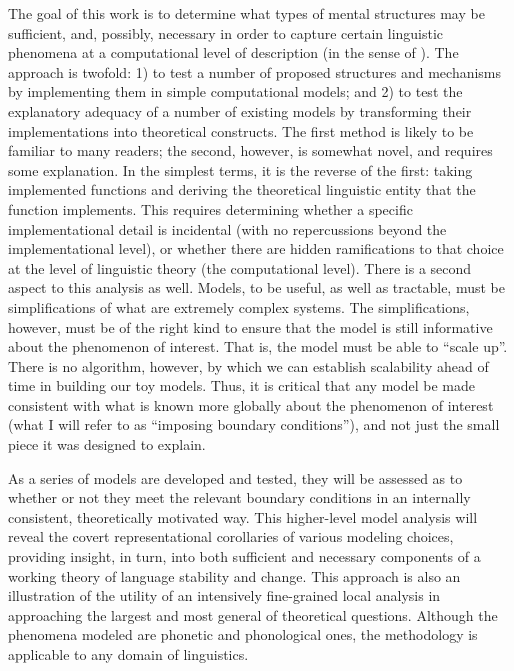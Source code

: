 The goal of this work is to determine what types of mental structures
may be sufficient, and, possibly, necessary in order to capture certain
linguistic phenomena at a computational level of description (in the
sense of \citealt{marr1982vision}). The approach is twofold: 1) to
test a number of proposed structures and mechanisms by implementing
them in simple computational models; and 2) to test the explanatory
adequacy of a number of existing models by transforming their implementations
into theoretical constructs. The first method is likely to be familiar
to many readers; the second, however, is somewhat novel, and requires
some explanation. In the simplest terms, it is the reverse of the
first: taking implemented functions and deriving the theoretical linguistic
entity that the function implements. This requires determining whether
a specific implementational detail is incidental (with no repercussions
beyond the implementational level), or whether there are hidden ramifications
to that choice at the level of linguistic theory (the computational
level). There is a second aspect to this analysis as well. Models,
to be useful, as well as tractable, must be simplifications of what
are extremely complex systems. The simplifications, however, must
be of the right kind to ensure that the model is still informative
about the phenomenon of interest. That is, the model must be able
to “scale up”. There is no algorithm, however, by which we can
establish scalability ahead of time in building our toy models. Thus,
it is critical that any model be made consistent with what is known
more globally about the phenomenon of interest (what I will refer to as ``imposing
boundary conditions''), and not just the small piece it was designed
to explain. 

As a series of models are developed and tested, they will be assessed
as to whether or not they meet the relevant boundary conditions in
an internally consistent, theoretically motivated way. This higher-level
model analysis will reveal the covert representational corollaries
of various modeling choices, providing insight, in turn, into both
sufficient and necessary components of a working theory of language
stability and change. This approach is also an illustration of the
utility of an intensively fine-grained local analysis in approaching
the largest and most general of theoretical questions. Although the
phenomena modeled are phonetic and phonological ones, the methodology
is applicable to any domain of linguistics. 

